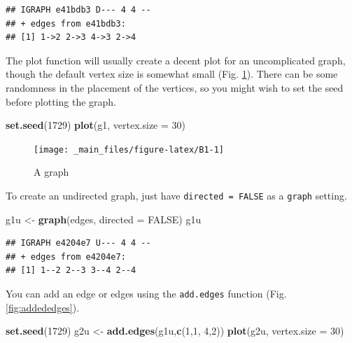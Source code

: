 \documentclass[
]{book}
\newenvironment{Shaded}{\begin{snugshade}}{\end{snugshade}}
\newcommand{\AttributeTok}[1]{\textcolor[rgb]{0.13,0.29,0.53}{#1}}
\newcommand{\ConstantTok}[1]{\textcolor[rgb]{0.56,0.35,0.01}{#1}}
\newcommand{\DecValTok}[1]{\textcolor[rgb]{0.00,0.00,0.81}{#1}}
\newcommand{\FunctionTok}[1]{\textcolor[rgb]{0.13,0.29,0.53}{\textbf{#1}}}
\newcommand{\NormalTok}[1]{#1}
\newcommand{\OtherTok}[1]{\textcolor[rgb]{0.56,0.35,0.01}{#1}}
\theoremstyle{definition}
\theoremstyle{definition}
\theoremstyle{definition}
\theoremstyle{definition}
\theoremstyle{remark}
\begin{document}
\begin{verbatim}
## IGRAPH e41bdb3 D--- 4 4 -- 
## + edges from e41bdb3:
## [1] 1->2 2->3 4->3 2->4
\end{verbatim}

The plot function will usually create a decent plot for an uncomplicated graph, though the default vertex size is somewhat small (Fig. \ref{fig:B1}). There can be some randomness in the placement of the vertices, so you might wish to set the seed before plotting the graph.

\begin{Shaded}
\begin{Highlighting}[]
\FunctionTok{set.seed}\NormalTok{(}\DecValTok{1729}\NormalTok{)}
\FunctionTok{plot}\NormalTok{(g1, }\AttributeTok{vertex.size =} \DecValTok{30}\NormalTok{)}
\end{Highlighting}
\end{Shaded}

\begin{figure}

{\centering \texttt{[image: \_main\_files/figure-latex/B1-1]} 

}

\caption{A graph}\label{fig:B1}
\end{figure}

To create an undirected graph, just have \texttt{directed\ =\ FALSE} as a \texttt{graph} setting.

\begin{Shaded}
\begin{Highlighting}[]
\NormalTok{g1u }\OtherTok{\textless{}{-}} \FunctionTok{graph}\NormalTok{(edges, }\AttributeTok{directed =} \ConstantTok{FALSE}\NormalTok{)}
\NormalTok{g1u}
\end{Highlighting}
\end{Shaded}

\begin{verbatim}
## IGRAPH e4204e7 U--- 4 4 -- 
## + edges from e4204e7:
## [1] 1--2 2--3 3--4 2--4
\end{verbatim}

You can add an edge or edges using the \texttt{add.edges} function (Fig. \ref{fig:addededges}).

\begin{Shaded}
\begin{Highlighting}[]
\FunctionTok{set.seed}\NormalTok{(}\DecValTok{1729}\NormalTok{)}
\NormalTok{g2u }\OtherTok{\textless{}{-}} \FunctionTok{add.edges}\NormalTok{(g1u,}\FunctionTok{c}\NormalTok{(}\DecValTok{1}\NormalTok{,}\DecValTok{1}\NormalTok{, }\DecValTok{4}\NormalTok{,}\DecValTok{2}\NormalTok{))}
\FunctionTok{plot}\NormalTok{(g2u, }\AttributeTok{vertex.size =} \DecValTok{30}\NormalTok{)}
\end{Highlighting}
\end{Shaded}
\end{document}
